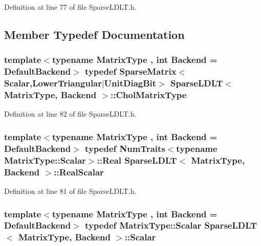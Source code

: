 Definition at line 77 of file Sparse\-L\-D\-L\-T.\-h.



\subsection{Member Typedef Documentation}
\hypertarget{class_sparse_l_d_l_t_afb27f74b89720bfbe06ab12409bae216}{
\subsubsection[{Chol\-Matrix\-Type}]{\setlength{\rightskip}{0pt plus 5cm}template$<$typename Matrix\-Type , int Backend = Default\-Backend$>$ typedef {\bf Sparse\-Matrix}$<${\bf Scalar},{\bf Lower\-Triangular}$|${\bf Unit\-Diag\-Bit}$>$ {\bf Sparse\-L\-D\-L\-T}$<$ Matrix\-Type, Backend $>$\-::{\bf Chol\-Matrix\-Type}\hspace{0.3cm}{\ttfamily [protected]}}}\label{class_sparse_l_d_l_t_afb27f74b89720bfbe06ab12409bae216}


Definition at line 82 of file Sparse\-L\-D\-L\-T.\-h.

\hypertarget{class_sparse_l_d_l_t_a3c48b09bdb95ae052b9d58f592b21913}{
\subsubsection[{Real\-Scalar}]{\setlength{\rightskip}{0pt plus 5cm}template$<$typename Matrix\-Type , int Backend = Default\-Backend$>$ typedef {\bf Num\-Traits}$<$typename Matrix\-Type\-::\-Scalar$>$\-::Real {\bf Sparse\-L\-D\-L\-T}$<$ Matrix\-Type, Backend $>$\-::{\bf Real\-Scalar}\hspace{0.3cm}{\ttfamily [protected]}}}\label{class_sparse_l_d_l_t_a3c48b09bdb95ae052b9d58f592b21913}


Definition at line 81 of file Sparse\-L\-D\-L\-T.\-h.

\hypertarget{class_sparse_l_d_l_t_aa430312ee979894c41a44b200c9dfcc0}{
\subsubsection[{Scalar}]{\setlength{\rightskip}{0pt plus 5cm}template$<$typename Matrix\-Type , int Backend = Default\-Backend$>$ typedef Matrix\-Type\-::\-Scalar {\bf Sparse\-L\-D\-L\-T}$<$ Matrix\-Type, Backend $>$\-::{\bf Scalar}\hspace{0.3cm}{\ttfamily [protected]}}}\label{class_sparse_l_d_l_t_aa430312ee979894c41a44b200c9dfcc0}


